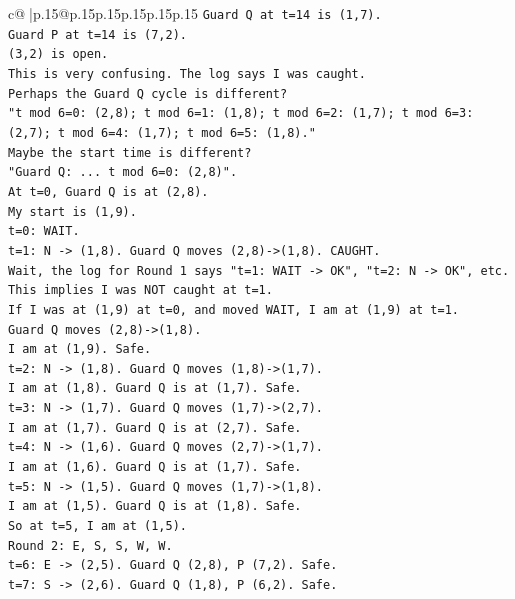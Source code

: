 \documentclass{article}
\begin{document}
{\begin{supertabular}{c@{$\;$}|p{.15\linewidth}@{}p{.15\linewidth}p{.15\linewidth}p{.15\linewidth}p{.15\linewidth}p{.15\linewidth}}
{{{\texttt{Guard Q at t=14 is (1,7).} \\
\texttt{Guard P at t=14 is (7,2).} \\
\texttt{(3,2) is open.} \\
\texttt{This is very confusing. The log says I was caught.} \\
\texttt{Perhaps the Guard Q cycle is different?} \\
\texttt{"t mod 6=0: (2,8); t mod 6=1: (1,8); t mod 6=2: (1,7); t mod 6=3: (2,7); t mod 6=4: (1,7); t mod 6=5: (1,8)."} \\
\texttt{Maybe the start time is different?} \\
\texttt{"Guard Q: ... t mod 6=0: (2,8)".} \\
\texttt{At t=0, Guard Q is at (2,8).} \\
\texttt{My start is (1,9).} \\
\texttt{t=0: WAIT.} \\
\texttt{t=1: N {-}> (1,8). Guard Q moves (2,8){-}>(1,8). CAUGHT.} \\
\texttt{Wait, the log for Round 1 says "t=1: WAIT {-}> OK", "t=2: N {-}> OK", etc.} \\
\texttt{This implies I was NOT caught at t=1.} \\
\texttt{If I was at (1,9) at t=0, and moved WAIT, I am at (1,9) at t=1.} \\
\texttt{Guard Q moves (2,8){-}>(1,8).} \\
\texttt{I am at (1,9). Safe.} \\
\texttt{t=2: N {-}> (1,8). Guard Q moves (1,8){-}>(1,7).} \\
\texttt{I am at (1,8). Guard Q is at (1,7). Safe.} \\
\texttt{t=3: N {-}> (1,7). Guard Q moves (1,7){-}>(2,7).} \\
\texttt{I am at (1,7). Guard Q is at (2,7). Safe.} \\
\texttt{t=4: N {-}> (1,6). Guard Q moves (2,7){-}>(1,7).} \\
\texttt{I am at (1,6). Guard Q is at (1,7). Safe.} \\
\texttt{t=5: N {-}> (1,5). Guard Q moves (1,7){-}>(1,8).} \\
\texttt{I am at (1,5). Guard Q is at (1,8). Safe.} \\
\texttt{So at t=5, I am at (1,5).} \\
\texttt{Round 2: E, S, S, W, W.} \\
\texttt{t=6: E {-}> (2,5). Guard Q (2,8), P (7,2). Safe.} \\
\texttt{t=7: S {-}> (2,6). Guard Q (1,8), P (6,2). Safe.} \\
}}}
\end{supertabular}}
\end{document}
